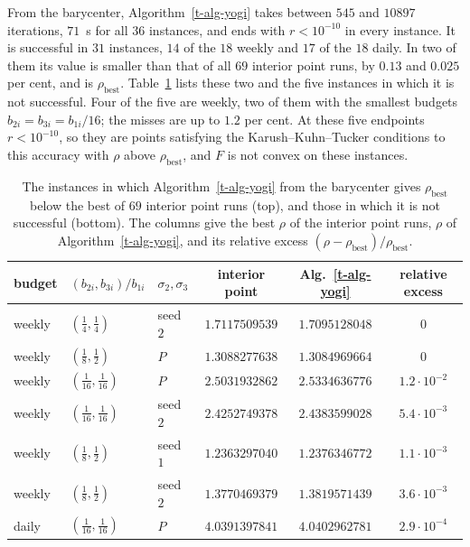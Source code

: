 \documentclass[11pt]{article}
\theoremstyle{plain}
\theoremstyle{remark}
\numberwithin{equation}{section}
\begin{document}
From the barycenter, Algorithm~\ref{t-alg-yogi} takes between $545$ and
$10897$ iterations, $71$~s for all $36$ instances, and ends with $r<10^{-10}$
in every instance. It is successful in $31$ instances, $14$ of the $18$
weekly and $17$ of the $18$ daily. In two of them its value is smaller than
that of all $69$ interior point runs, by $0.13$ and $0.025$ per cent, and is
$\rho_{\mathrm{best}}$. Table~\ref{t-tab-yogi-inst} lists these two and the
five instances in which it is not successful. Four of the five are weekly,
two of them with the smallest budgets $b_{2i}=b_{3i}=b_{1i}/16$; the misses are
up to $1.2$ per cent. At these five endpoints $r<10^{-10}$, so they are points
satisfying the Karush--Kuhn--Tucker conditions to this accuracy with $\rho$
above $\rho_{\mathrm{best}}$, and $F$ is not convex on these instances.

\begin{table}[ht]
\centering
\small
\begin{tabular}{lllccc}
\hline
budget & $(b_{2i},b_{3i})/b_{1i}$ & $\sigma_2,\sigma_3$ & interior point &
Alg.~\ref{t-alg-yogi} & relative excess\\
\hline
weekly & $(\tfrac14,\tfrac14)$       & seed $2$ & $1.7117509539$ & $1.7095128048$ & $0$\\
weekly & $(\tfrac18,\tfrac12)$       & $P$      & $1.3088277638$ & $1.3084969664$ & $0$\\
\hline
weekly & $(\tfrac1{16},\tfrac1{16})$ & $P$      & $2.5031932862$ & $2.5334636776$ & $1.2\cdot 10^{-2}$\\
weekly & $(\tfrac1{16},\tfrac1{16})$ & seed $2$ & $2.4252749378$ & $2.4383599028$ & $5.4\cdot 10^{-3}$\\
weekly & $(\tfrac18,\tfrac12)$       & seed $1$ & $1.2363297040$ & $1.2376346772$ & $1.1\cdot 10^{-3}$\\
weekly & $(\tfrac18,\tfrac12)$       & seed $2$ & $1.3770469379$ & $1.3819571439$ & $3.6\cdot 10^{-3}$\\
daily  & $(\tfrac1{16},\tfrac1{16})$ & $P$      & $4.0391397841$ & $4.0402962781$ & $2.9\cdot 10^{-4}$\\
\hline
\end{tabular}
\caption{The instances in which Algorithm~\ref{t-alg-yogi} from the barycenter
gives $\rho_{\mathrm{best}}$ below the best of $69$ interior point runs (top),
and those in which it is not successful (bottom). The columns give the best
$\rho$ of the interior point runs, $\rho$ of Algorithm~\ref{t-alg-yogi}, and
its relative excess $(\rho-\rho_{\mathrm{best}})/\rho_{\mathrm{best}}$.}\label{t-tab-yogi-inst}
\end{table}
\end{document}
